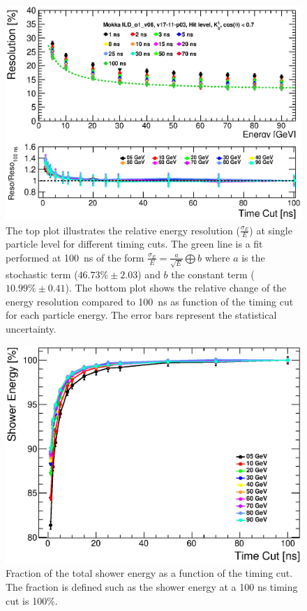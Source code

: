 \begin{figure}[htbp!]
  \centering
  \includegraphics[width=0.6\linewidth]{../Thesis_Plots/ILD/NoSmearing/Plots/ShowerResoAbsolute_TimeCuts_noSmearing.eps}
  \caption{The top plot illustrates the relative energy resolution ($\frac{\sigma_{E}}{E}$) at single particle level for different timing cuts. The green line is a fit performed at \SI{100}{\nano\second} of the form $\frac{\sigma_{E}}{E} = \frac{a}{\sqrt{E}} \bigoplus b$ where $a$ is the stochastic term ($46.73\% \pm 2.03$) and $b$ the constant term ($10.99\% \pm 0.41$). The bottom plot shows the relative change of the energy resolution compared to \SI{100}{\nano\second} as function of the timing cut for each particle energy. The error bars represent the statistical uncertainty.} \label{fig:resoNoSmearing}
\end{figure}

\begin{figure}[htbp!]
  \centering
  \includegraphics[width=0.6\linewidth]{../Thesis_Plots/ILD/NoSmearing/Plots/ShowerEnergy_TimeCuts_noSmearing.eps}
  \caption{Fraction of the total shower energy as a function of the timing cut. The fraction is defined such as the shower energy at a 100 ns timing cut is 100\%.} \label{fig:ShowerEnergyNoSmearing}
\end{figure}

